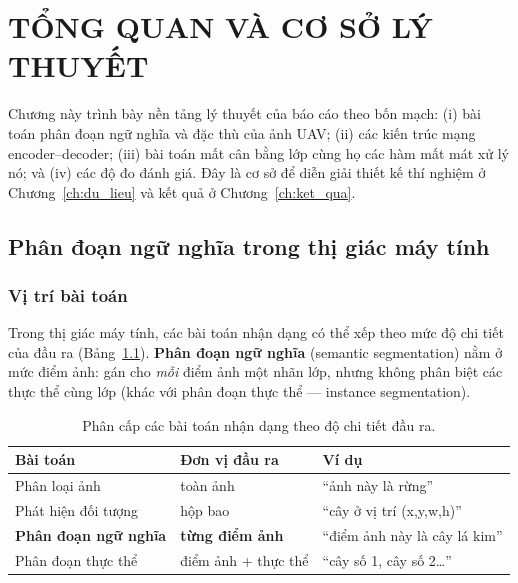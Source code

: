 \chapter{TỔNG QUAN VÀ CƠ SỞ LÝ THUYẾT}
\label{ch:tong_quan}

Chương này trình bày nền tảng lý thuyết của báo cáo theo bốn mạch: (i) bài toán phân
đoạn ngữ nghĩa và đặc thù của ảnh UAV; (ii) các kiến trúc mạng encoder--decoder; (iii)
bài toán mất cân bằng lớp cùng họ các hàm mất mát xử lý nó; và (iv) các độ đo đánh
giá. Đây là cơ sở để diễn giải thiết kế thí nghiệm ở Chương~\ref{ch:du_lieu} và kết
quả ở Chương~\ref{ch:ket_qua}.

\section{Phân đoạn ngữ nghĩa trong thị giác máy tính}

\subsection{Vị trí bài toán}
Trong thị giác máy tính, các bài toán nhận dạng có thể xếp theo mức độ chi tiết của
đầu ra (Bảng~\ref{tab:cv_tasks}). \textbf{Phân đoạn ngữ nghĩa} (semantic segmentation)
nằm ở mức điểm ảnh: gán cho \emph{mỗi} điểm ảnh một nhãn lớp, nhưng không phân biệt
các thực thể cùng lớp (khác với phân đoạn thực thể --- instance segmentation).

\begin{table}[H]
\centering
\caption{Phân cấp các bài toán nhận dạng theo độ chi tiết đầu ra.}
\label{tab:cv_tasks}
\small
\begin{tabular}{l l l}
\toprule
\textbf{Bài toán} & \textbf{Đơn vị đầu ra} & \textbf{Ví dụ} \\
\midrule
Phân loại ảnh        & toàn ảnh           & ``ảnh này là rừng'' \\
Phát hiện đối tượng  & hộp bao            & ``cây ở vị trí (x,y,w,h)'' \\
\textbf{Phân đoạn ngữ nghĩa} & \textbf{từng điểm ảnh} & ``điểm ảnh này là cây lá kim'' \\
Phân đoạn thực thể   & điểm ảnh + thực thể & ``cây số 1, cây số 2\dots'' \\
\bottomrule
\end{tabular}
\end{table}

